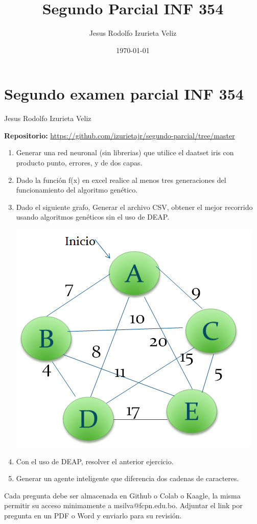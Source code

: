 \documentclass[letter]{article}
\author{Jesus Rodolfo Izurieta Veliz}
\date{\today}
\title{Segundo Parcial INF 354}
\begin{document}
\maketitle


\section{Segundo examen parcial INF 354}
\label{sec:org39f43a8}

Jesus Rodolfo Izurieta Veliz

\textbf{Repositorio:} \url{https://github.com/izurietajr/segundo-parcial/tree/master}

\begin{enumerate}
\item Generar una red neuronal (sin librerias) que utilice el daatset iris con
producto punto, errores, y de dos capas.

\item Dado la función f(x) en excel realice al menos tres generaciones del
funcionamiento del algoritmo genético.

\item Dado el siguiente grafo, Generar el archivo CSV, obtener el mejor recorrido
usando algoritmos genéticos sin el uso de DEAP.

\begin{center}
\includegraphics[width=.9\linewidth]{./graph.png}
\end{center}

\item Con el uso de DEAP, resolver el anterior ejercicio.

\item Generar un agente inteligente que diferencia dos cadenas de caracteres.
\end{enumerate}

Cada pregunta debe ser almacenada en Github o Colab o Kaagle, la misma permitir
su acceso minimamente a msilva@fcpn.edu.bo. Adjuntar el link por pregunta en un
PDF o Word y enviarlo para su revisión.
\end{document}
